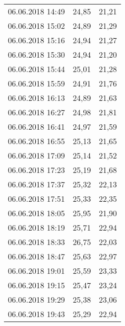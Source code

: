\documentclass[a4paper,11pt,twoside]{article}
\begin{document}
\begin{longtable}[c]{ccc}
06.06.2018 14:49       & 24,85                & 21,21                          \\
06.06.2018 15:02       & 24,89                & 21,29                          \\
06.06.2018 15:16       & 24,94                & 21,27                          \\
06.06.2018 15:30       & 24,94                & 21,20                          \\
06.06.2018 15:44       & 25,01                & 21,28                          \\
06.06.2018 15:59       & 24,91                & 21,76                          \\
06.06.2018 16:13       & 24,89                & 21,63                          \\
06.06.2018 16:27       & 24,98                & 21,81                          \\
06.06.2018 16:41       & 24,97                & 21,59                          \\
06.06.2018 16:55       & 25,13                & 21,65                          \\
06.06.2018 17:09       & 25,14                & 21,52                          \\
06.06.2018 17:23       & 25,19                & 21,68                          \\
06.06.2018 17:37       & 25,32                & 22,13                          \\
06.06.2018 17:51       & 25,33                & 22,35                          \\
06.06.2018 18:05       & 25,95                & 21,90                          \\
06.06.2018 18:19       & 25,71                & 22,94                          \\
06.06.2018 18:33       & 26,75                & 22,03                          \\
06.06.2018 18:47       & 25,63                & 22,97                          \\
06.06.2018 19:01       & 25,59                & 23,33                          \\
06.06.2018 19:15       & 25,47                & 23,24                          \\
06.06.2018 19:29       & 25,38                & 23,06                          \\
06.06.2018 19:43       & 25,29                & 22,94                          \\

\end{longtable}
\end{document}
